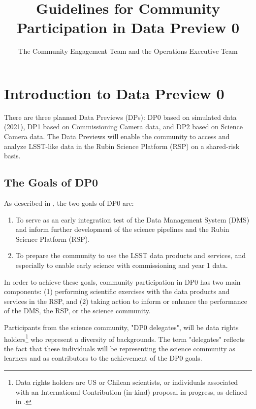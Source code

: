 \documentclass[DM,lsstdraft,authoryear,toc]{lsstdoc}
\title{Guidelines for Community Participation in Data Preview 0}
\author{The Community Engagement Team and the Operations Executive Team}
\date{\vcsDate}
\begin{document}
\maketitle

\renewcommand{\thepage}{\arabic{page}}%

\setcounter{page}{1}%


\section{Introduction to Data Preview 0}\label{sec:intro}

There are three planned Data Previews (DPs): DP0 based on simulated data (2021), DP1 based on Commissioning Camera data, and DP2 based on Science Camera data.
The Data Previews will enable the community to access and analyze LSST-like data in the Rubin Science Platform (RSP) on a shared-risk basis. 

\subsection{The Goals of DP0}\label{ssec:intro_goals}

As described in , the two goals of DP0 are:
\begin{enumerate}
\item To serve as an early integration test of the Data Management System (DMS) and inform further development of the science pipelines and the Rubin Science Platform (RSP).
\item To prepare the community to use the LSST data products and services, and especially to enable early science with commissioning and year 1 data.
\end{enumerate}

In order to achieve these goals, community participation in DP0 has two main components:
(1) performing scientific exercises with the data products and services in the RSP, and
(2) taking action to inform or enhance the performance of the DMS, the RSP, or the science community.

Participants from the science community, "DP0 delegates", will be data rights holders\footnote{Data rights holders are US or Chilean scientists, or individuals associated with an International Contribution (in-kind) proposal in progress, as defined in .} who represent a diversity of backgrounds.
The term "delegates" reflects the fact that these individuals will be representing the science community as learners and as contributors to the achievement of the DP0 goals.
\end{document}

